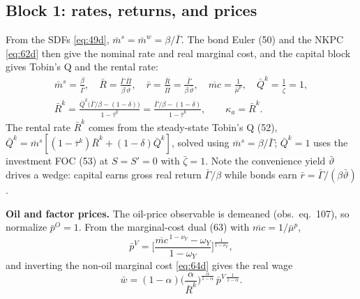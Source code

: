\subsection{Block 1: rates, returns, and prices}
From the SDFs \eqref{eq:49d}, $\bar m^s=\bar m^w=\beta/\bar\Gamma$. The bond Euler (50) and the NKPC
\eqref{eq:62d} then give the nominal rate and real marginal cost, and the capital block gives Tobin's Q
and the rental rate:
\begin{align}
\bar m^s=\frac{\beta}{\bar\Gamma},\quad
\bar R=\frac{\bar\Gamma\,\bar\Pi}{\beta\,\bar\vartheta},\quad
\bar r=\frac{\bar R}{\bar\Pi}=\frac{\bar\Gamma}{\beta\,\bar\vartheta},\quad
\overline{mc}=\frac{1}{\bar\mu^p},\quad
\bar Q^k=\frac{1}{\bar\zeta}=1, \label{eq:ss-prices1}\\[0.3em]
\bar R^k=\frac{\bar Q^k\big(\bar\Gamma/\beta-(1-\delta)\big)}{1-\bar\tau^k}
=\frac{\bar\Gamma/\beta-(1-\delta)}{1-\bar\tau^k},\qquad \kappa_a=\bar R^k. \label{eq:ss-prices2}
\end{align}
The rental rate $\bar R^k$ comes from the steady-state Tobin's Q (52),
$\bar Q^k=\bar m^s[(1-\bar\tau^k)\bar R^k+(1-\delta)\bar Q^k]$, solved using $\bar m^s=\beta/\bar\Gamma$;
$\bar Q^k=1$ uses the investment FOC (53) at $S=S'=0$ with $\bar\zeta=1$. Note the convenience yield
$\bar\vartheta$ drives a wedge: capital earns gross real return $\bar\Gamma/\beta$ while bonds earn
$\bar r=\bar\Gamma/(\beta\bar\vartheta)$.

\medskip\noindent
\textbf{Oil and factor prices.} The oil-price observable is demeaned (obs.\ eq.\ 107), so normalize
$\bar p^O=1$. From the marginal-cost dual (63) with $\overline{mc}=1/\bar\mu^p$,
\begin{equation}\label{eq:ss-pv}
\bar p^V=\Big[\frac{\overline{mc}^{\,1-\nu_Y}-\omega_Y}{1-\omega_Y}\Big]^{\frac{1}{1-\nu_Y}},
\end{equation}
and inverting the non-oil marginal cost \eqref{eq:64d} gives the real wage
\begin{equation}\label{eq:ss-w}
\bar w=(1-\alpha)\Big(\frac{\alpha}{\bar R^k}\Big)^{\frac{\alpha}{1-\alpha}}\,\bar p^{V\,\frac{1}{1-\alpha}} .
\end{equation}

